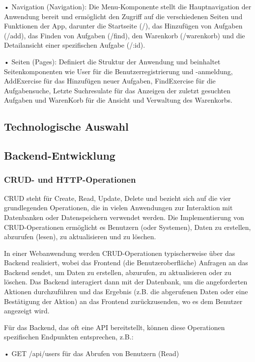 \documentclass[12pt,a4paper]{article} %
\begin{document}
•	Navigation (Navigation): Die Menu-Komponente stellt die Hauptnavigation der Anwendung bereit und ermöglicht den Zugriff auf die verschiedenen Seiten und Funktionen der App, darunter die Startseite (/), das Hinzufügen von Aufgaben (/add), das Finden von Aufgaben (/find), den Warenkorb (/warenkorb) und die Detailansicht einer spezifischen Aufgabe (/:id).

•	Seiten (Pages): Definiert die Struktur der Anwendung und beinhaltet Seitenkomponenten wie User für die Benutzerregistrierung und -anmeldung, AddExercise für das Hinzufügen neuer Aufgaben, FindExercise für die Aufgabensuche, Letzte Suchresulate für das Anzeigen der zuletzt gesuchten Aufgaben und WarenKorb für die Ansicht und Verwaltung des Warenkorbs.

\newpage


\subsection{Technologische Auswahl}

 
\subsection{Backend-Entwicklung}
\subsubsection{CRUD- und HTTP-Operationen}

CRUD steht für Create, Read, Update, Delete und bezieht sich auf die vier grundlegenden Operationen, die in vielen Anwendungen zur Interaktion mit Datenbanken oder Datenspeichern verwendet werden. Die Implementierung von CRUD-Operationen ermöglicht es Benutzern (oder Systemen), Daten zu erstellen, abzurufen (lesen), zu aktualisieren und zu löschen.

In einer Webanwendung werden CRUD-Operationen typischerweise über das Backend realisiert, wobei das Frontend (die Benutzeroberfläche) Anfragen an das Backend sendet, um Daten zu erstellen, abzurufen, zu aktualisieren oder zu löschen. Das Backend interagiert dann mit der Datenbank, um die angeforderten Aktionen durchzuführen und das Ergebnis (z.B. die abgerufenen Daten oder eine Bestätigung der Aktion) an das Frontend zurückzusenden, wo es dem Benutzer angezeigt wird.

Für das Backend, das oft eine API bereitstellt, können diese Operationen spezifischen Endpunkten entsprechen, z.B.:

•	    GET /api/users für das Abrufen von Benutzern (Read)
\end{document}
